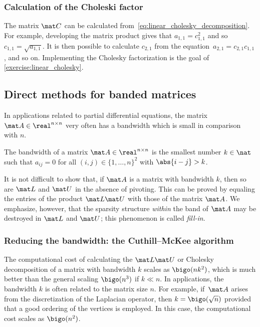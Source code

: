 \subsubsection*{Calculation of the Choleski factor}%

The matrix $\mat C$ can be calculated from~\eqref{eq:linear_cholesky_decomposition}.
For example, developing the matrix product gives that $a_{1,1} = c_{1, 1}^2$ and so $c_{1, 1} = \sqrt{a_{1,1}}$.
It is then possible to calculate $c_{2,1}$ from the equation~$a_{2, 1} = c_{2, 1} c_{1, 1}$, and so on.
Implementing the Cholesky factorization is the goal of \cref{exercise:linear_cholesky}.

\subsection{Direct methods for banded matrices}%

In applications related to partial differential equations,
the matrix $\mat A \in \real^{n \times n}$ very often has a bandwidth which is small in comparison with $n$.
\begin{definition}
    The bandwidth of a matrix $\mat A \in \real^{n \times n}$ is the smallest number $k \in \nat$ such that
    $a_{ij} = 0$ for all $(i, j) \in \{1, \dotsc, n\}^2$ with $\abs{i - j} > k$.
\end{definition}
It is not difficult to show that,
if $\mat A$ is a matrix with bandwidth $k$,
then so are $\mat L$ and $\mat U$ in the absence of pivoting.
This can be proved by equaling the entries of the product $\mat L \mat U$ with those of the matrix $\mat A$.
We emphasize, however, that the sparsity structure \emph{within} the band of $\mat A$ may be destroyed in $\mat L$ and $\mat U$;
this phenomenon is called \emph{fill-in}.

\subsubsection{Reducing the bandwidth: the Cuthill--McKee algorithm~\moreinfo}%
\label{ssub:reducing_the_bandwidth_the_cuthill_mckee_algorithm}

The computational cost of calculating the $\mat L \mat U$ or Cholesky decomposition of a matrix with bandwidth $k$ scales as $\bigo(n k^2)$,
which is much better than the general scaling $\bigo(n^3)$ if $k \ll n$.
In applications, the bandwidth $k$ is often related to the matrix size $n$.
For example, if~$\mat A$ arises from the discretization of the Laplacian operator, then $k = \bigo(\sqrt{n})$
provided that a good ordering of the vertices is employed.
In this case, the computational cost scales as $\bigo(n^2)$.

